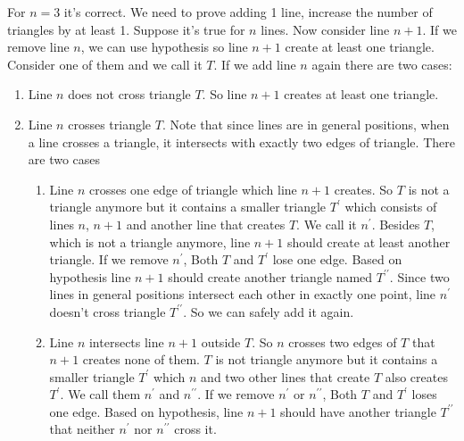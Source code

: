 \documentclass{book}
\begin{document}
	For $n = 3$ it's correct. We need to prove adding 1 line, increase the number of triangles by at least 1. Suppose it's true for $n$ lines. Now consider line $n + 1$. If we remove line $n$, we can use hypothesis so line $n + 1$ create at least one triangle. Consider one of them and we call it $T$. If we add line $n$ again there are two cases:
	\begin{enumerate}
		\item Line $n$ does not cross triangle $T$. So line $n + 1$ creates at least  one triangle.
		\item Line $n$ crosses triangle $T$. Note that since lines are in general positions, when a line crosses a triangle, it intersects with exactly two edges of triangle. There are two cases
		\begin{enumerate}
			\item Line $n$ crosses one edge of triangle which line $n + 1$ creates. So $T$ is not a triangle anymore but it contains a smaller triangle $T^\prime$ which consists of lines $n$, $n + 1$ and another line that creates $T$. We call it $n^\prime$. Besides $T$, which is not a triangle anymore, line $n +1$ should create at least another triangle. If we remove $n^\prime$, Both $T$ and $T^\prime$ lose one edge. Based on hypothesis line $n + 1$ should create another triangle named $T^{\prime\prime}$. Since two lines in general positions intersect each other in exactly one point, line $n^\prime$ doesn't cross triangle $T^{\prime\prime}$. So we can safely add it again.
			\item Line $n$ intersects line $n + 1$ outside $T$. So $n$ crosses two edges of $T$ that $n + 1$ creates none of them. $T$ is not triangle anymore but it contains a smaller triangle $T^\prime$ which $n$ and two other lines that create $T$ also creates $T^\prime$. We call them $n^\prime$ and $n^{\prime\prime}$. If we remove $n^\prime$ or $n^{\prime\prime}$, Both $T$ and $T^\prime$ loses one edge. Based on hypothesis, line $n + 1$ should have another triangle $T^{\prime\prime}$ that neither $n^\prime$ nor $n^{\prime\prime}$ cross it.
		\end{enumerate}
	\end{enumerate}
\end{document}
